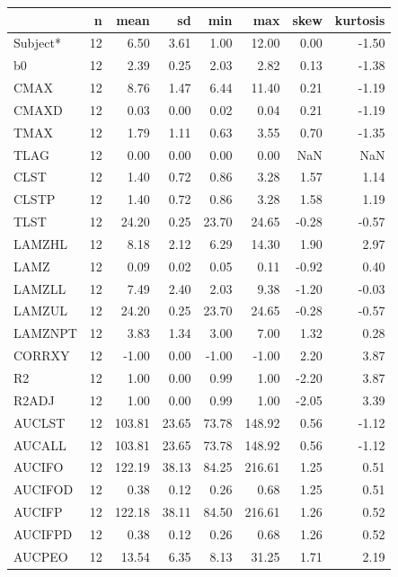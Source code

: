 \documentclass[12pt,]{krantz}
\begin{document}
\begin{tabular}{l|r|r|r|r|r|r|r}
\hline
  & n & mean & sd & min & max & skew & kurtosis\\
\hline
Subject* & 12 & 6.50 & 3.61 & 1.00 & 12.00 & 0.00 & -1.50\\
\hline
b0 & 12 & 2.39 & 0.25 & 2.03 & 2.82 & 0.13 & -1.38\\
\hline
CMAX & 12 & 8.76 & 1.47 & 6.44 & 11.40 & 0.21 & -1.19\\
\hline
CMAXD & 12 & 0.03 & 0.00 & 0.02 & 0.04 & 0.21 & -1.19\\
\hline
TMAX & 12 & 1.79 & 1.11 & 0.63 & 3.55 & 0.70 & -1.35\\
\hline
TLAG & 12 & 0.00 & 0.00 & 0.00 & 0.00 & NaN & NaN\\
\hline
CLST & 12 & 1.40 & 0.72 & 0.86 & 3.28 & 1.57 & 1.14\\
\hline
CLSTP & 12 & 1.40 & 0.72 & 0.86 & 3.28 & 1.58 & 1.19\\
\hline
TLST & 12 & 24.20 & 0.25 & 23.70 & 24.65 & -0.28 & -0.57\\
\hline
LAMZHL & 12 & 8.18 & 2.12 & 6.29 & 14.30 & 1.90 & 2.97\\
\hline
LAMZ & 12 & 0.09 & 0.02 & 0.05 & 0.11 & -0.92 & 0.40\\
\hline
LAMZLL & 12 & 7.49 & 2.40 & 2.03 & 9.38 & -1.20 & -0.03\\
\hline
LAMZUL & 12 & 24.20 & 0.25 & 23.70 & 24.65 & -0.28 & -0.57\\
\hline
LAMZNPT & 12 & 3.83 & 1.34 & 3.00 & 7.00 & 1.32 & 0.28\\
\hline
CORRXY & 12 & -1.00 & 0.00 & -1.00 & -1.00 & 2.20 & 3.87\\
\hline
R2 & 12 & 1.00 & 0.00 & 0.99 & 1.00 & -2.20 & 3.87\\
\hline
R2ADJ & 12 & 1.00 & 0.00 & 0.99 & 1.00 & -2.05 & 3.39\\
\hline
AUCLST & 12 & 103.81 & 23.65 & 73.78 & 148.92 & 0.56 & -1.12\\
\hline
AUCALL & 12 & 103.81 & 23.65 & 73.78 & 148.92 & 0.56 & -1.12\\
\hline
AUCIFO & 12 & 122.19 & 38.13 & 84.25 & 216.61 & 1.25 & 0.51\\
\hline
AUCIFOD & 12 & 0.38 & 0.12 & 0.26 & 0.68 & 1.25 & 0.51\\
\hline
AUCIFP & 12 & 122.18 & 38.11 & 84.50 & 216.61 & 1.26 & 0.52\\
\hline
AUCIFPD & 12 & 0.38 & 0.12 & 0.26 & 0.68 & 1.26 & 0.52\\
\hline
AUCPEO & 12 & 13.54 & 6.35 & 8.13 & 31.25 & 1.71 & 2.19\\

\end{tabular}
\end{document}
